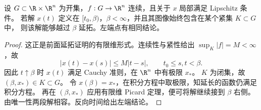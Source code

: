 \begin{proposition}[有限维紧集延拓判据]\label{prop:compact-extension-vector}
设 $G\subset\R\times\R^n$ 为开集，$f:G\to\R^n$ 连续，且关于 $x$ 局部满足 Lipschitz 条件。
若解 $x(t)$ 定义在 $[t_0,\beta)$，$\beta<\infty$，并且其图像始终包含在某个紧集 $K\subset G$ 中，
则该解能够越过 $\beta$ 延拓。左端点有相同结论。
\end{proposition}
\begin{proof}
这正是前面延拓证明的有限维形式。连续性与紧性给出 $\sup_K|f|=M<\infty$，故
\[
 |x(t)-x(s)|\leq M|t-s|,\qquad t_0\leq s,t<\beta.
\]
因此 $t\uparrow\beta$ 时 $x(t)$ 满足 Cauchy 准则，在 $\R^n$ 中有极限 $x_*$。
$K$ 为闭集，故 $(\beta,x_*)\in K\subset G$。
令 $x(\beta)=x_*$，在积分方程中取极限，知延长的函数仍满足积分方程。
再在 $(\beta,x_*)$ 应用有限维 Picard 定理，便可将解继续接到 $\beta$ 右侧。
由唯一性两段解相容。反向时间给出左端结论。
\end{proof}
